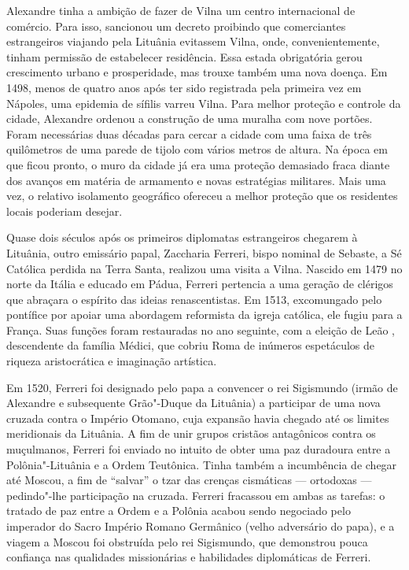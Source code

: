 Alexandre tinha a ambição de fazer de Vilna um centro internacional de
comércio. Para isso, sancionou um decreto proibindo que comerciantes
estrangeiros viajando pela Lituânia evitassem Vilna, onde,
convenientemente, tinham permissão de estabelecer residência. Essa
estada obrigatória gerou crescimento urbano e prosperidade, mas trouxe
também uma nova doença. Em 1498, menos de quatro anos após ter sido
registrada pela primeira vez em Nápoles, uma epidemia de sífilis varreu
Vilna. Para melhor proteção e controle da cidade, Alexandre ordenou a
construção de uma muralha com nove portões. Foram necessárias duas
décadas para cercar a cidade com uma faixa de três quilômetros de uma
parede de tijolo com vários metros de altura. Na época em que ficou
pronto, o muro da cidade já era uma proteção demasiado fraca diante dos
avanços em matéria de armamento e novas estratégias militares. Mais uma
vez, o relativo isolamento geográfico ofereceu a melhor proteção que os
residentes locais poderiam desejar.

Quase dois séculos após os primeiros diplomatas estrangeiros chegarem à
Lituânia, outro emissário papal, Zaccharia Ferreri, bispo nominal de
Sebaste, a Sé Católica perdida na Terra Santa, realizou uma visita a
Vilna. Nascido em 1479 no norte da Itália e educado em Pádua, Ferreri
pertencia a uma geração de clérigos que abraçara o espírito das ideias
renascentistas. Em 1513, excomungado pelo pontífice por apoiar uma
abordagem reformista da igreja católica, ele fugiu para a França. Suas
funções foram restauradas no ano seguinte, com a eleição de Leão ,
descendente da família Médici, que cobriu Roma de inúmeros espetáculos
de riqueza aristocrática e imaginação artística.

%

Em 1520, Ferreri foi designado pelo papa a convencer o rei Sigismundo
(irmão de Alexandre e subsequente Grão"-Duque da Lituânia) a participar
de uma nova cruzada contra o Império Otomano, cuja expansão havia
chegado até os limites meridionais da Lituânia. A fim de unir grupos
cristãos antagônicos contra os muçulmanos, Ferreri foi enviado no
intuito de obter uma paz duradoura entre a Polônia"-Lituânia e a Ordem
Teutônica. Tinha também a incumbência de chegar até Moscou, a fim de
``salvar'' o tzar das crenças cismáticas --- ortodoxas --- pedindo"-lhe
participação na cruzada. Ferreri fracassou em ambas as tarefas: o
tratado de paz entre a Ordem e a Polônia acabou sendo negociado pelo
imperador do Sacro Império Romano Germânico (velho adversário do papa),
e a viagem a Moscou foi obstruída pelo rei Sigismundo, que demonstrou
pouca confiança nas qualidades missionárias e habilidades diplomáticas
de Ferreri.

